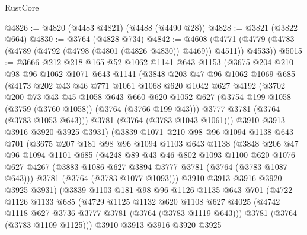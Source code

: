 \begin{lexlean}{RustCore}
\begin{coremodule}
@4826 := @4820 (@4483 @4821) (@4488 (@4490 @28))
@4828 := @3821 (@3822 @664)
@4830 := @3764 (@4828 @734)
@4842 := @4608
    (@4771 (@4779 (@4783 (@4789 (@4792 (@4798 (@4801 (@4826 @4830)) @4469)) @4511)) @4533))
@5015 := @3666
    @212
    @218
    @165
    @52
    @1062
    @1141
    @643
    @1153
    (@3675
      @204
      @210
      @98
      @96
      @1062
      @1071
      @643
      @1141
      (@3848
        @203
        @47
        @96
        @1062
        @1069
        @685
        (@4173
          @202
          @43
          @46
          @771
          @1061
          @1068
          @620
          @1042
          @627
          @4192
          (@3702
            @200
            @73
            @43
            @45
            @1058
            @643
            @660
            @620
            @1052
            @627
            (@3754 @199 @1058 (@3759 (@3760 @1058)) (@3764 (@3766 @199 @43)))
            @3777
            @3781
            (@3764 (@3783 @1053 @643)))
          @3781
          (@3764 (@3783 @1043 @1061)))
        @3910
        @3913
        @3916
        @3920
        @3925
        @3931)
      (@3839
        @1071
        @210
        @98
        @96
        @1094
        @1138
        @643
        @701
        (@3675
          @207
          @181
          @98
          @96
          @1094
          @1103
          @643
          @1138
          (@3848
            @206
            @47
            @96
            @1094
            @1101
            @685
            (@4248
              @89
              @43
              @46
              @802
              @1093
              @1100
              @620
              @1076
              @627
              @4267
              (@3883 @1086 @627 @3894 @3777 @3781 (@3764 (@3783 @1087 @643)))
              @3781
              (@3764 (@3783 @1077 @1093)))
            @3910
            @3913
            @3916
            @3920
            @3925
            @3931)
          (@3839
            @1103
            @181
            @98
            @96
            @1126
            @1135
            @643
            @701
            (@4722
              @1126
              @1133
              @685
              (@4729
                @1125
                @1132
                @620
                @1108
                @627
                @4025
                (@4742 @1118 @627 @3736 @3777 @3781 (@3764 (@3783 @1119 @643)))
                @3781
                (@3764 (@3783 @1109 @1125)))
              @3910
              @3913
              @3916
              @3920
              @3925

\end{coremodule}
\end{lexlean}

